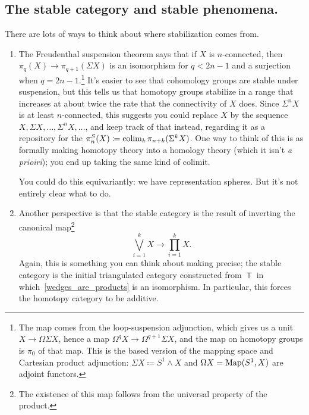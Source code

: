 \subsection*{The stable category and stable phenomena.}
There are lots of ways to think about where stabilization comes from.
\begin{enumerate}
	\item The Freudenthal suspension theorem says that if $X$ is $n$-connected, then $\pi_q(X)\to\pi_{q+1}(\Sigma
	X)$ is an isomorphism for $q < 2n-1$ and a surjection when $q = 2n-1$.\footnote{The map comes from the
	loop-suspension adjunction, which gives us a unit $X\to\Omega\Sigma X$, hence a map
	$\Omega^qX\to\Omega^{q+1}\Sigma X$, and the map on homotopy groups is $\pi_0$ of that map. This is the based
	version of the mapping space and Cartesian product adjunction: $\Sigma X\coloneqq S^1\wedge X$ and $\Omega X =
	\operatorname{Map}(S^1, X)$ are adjoint functors.} It's easier to see that cohomology groups are stable under suspension, but
	this tells us that homotopy groups stabilize in a range that increases at about twice the rate that the
	connectivity of $X$ does. Since $\Sigma^n X$ is at least $n$-connected, this suggests you could replace $X$ by
	the sequence $X, \Sigma X,\dotsc,\Sigma^n X,\dotsc$, and keep track of that instead, regarding it as a
	repository for the  $\pi_n^S(X)\coloneqq\operatorname{colim}_k \pi_{n+k}(\Sigma^k X)$. One way
	to think of this is as formally making homotopy theory into a homology theory (which it isn't \textit{a
	prioiri}); you end up taking the same kind of colimit.

	You could do this equivariantly: we have representation spheres. But it's not entirely clear what to do.
	\item Another perspective is that the stable category is the result of inverting the canonical map\footnote{The
	existence of this map follows from the universal property of the product.}
	\begin{equation}
	\label{wedges_are_products}
	\bigvee_{i=1}^k X\to\prod_{i=1}^k X.
	\end{equation}
	Again, this is something you can think about making precise; the stable category is the initial triangulated
	category constructed from $\Top$ in which~\eqref{wedges_are_products} is an isomorphism. In particular, this
	forces the homotopy category to be additive.


\end{enumerate}
